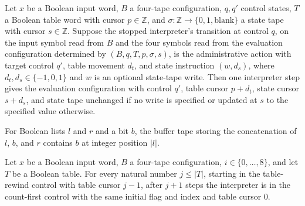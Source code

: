 \begin{lemma}
\label{Turing.timedCut_Eval_step}
\leanok
{}
Let $x$ be a Boolean input word, $B$ a four-tape configuration, $q,q'$ control states,
$T$ a Boolean table word with cursor $p\in\mathbb Z$, and $\sigma\colon\mathbb
Z\to\{0,1,\mathrm{blank}\}$ a state tape with cursor $s\in\mathbb Z$. Suppose the
stopped interpreter's transition at control $q$, on the input symbol read from $B$ and
the four symbols read from the evaluation configuration determined by
$(B,q,T,p,\sigma,s)$, is the administrative action with target control $q'$, table
movement $d_t$, and state instruction $(w,d_s)$, where $d_t,d_s\in\{-1,0,1\}$ and $w$ is
an optional state-tape write. Then one interpreter step gives the evaluation
configuration with control $q'$, table cursor $p+d_t$, state cursor $s+d_s$, and state
tape unchanged if no write is specified or updated at $s$ to the specified value
otherwise.
\end{lemma}

\begin{lemma}
\label{Turing.timedCut_table_read}
\leanok
{}
For Boolean lists $l$ and $r$ and a bit $b$, the buffer tape storing the concatenation
of $l$, $b$, and $r$ contains $b$ at integer position $|l|$.
\end{lemma}

\begin{lemma}
\label{Turing.timedCut_table_rewind}
\leanok
{}
Let $x$ be a Boolean input word, $B$ a four-tape configuration, $i\in\{0,\ldots,8\}$,
and let $T$ be a Boolean table. For every natural number $j\le |T|$, starting in the
table-rewind control with table cursor $j-1$, after $j+1$ steps the interpreter is in
the count-first control with the same initial flag and index and table cursor $0$.
\end{lemma}

